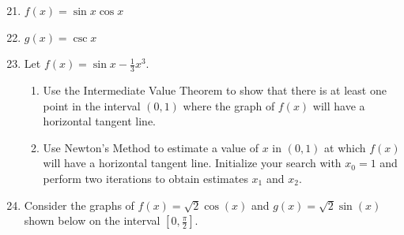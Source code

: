 \documentclass[12pt]{article}
\newif\ifans
\begin{document}
\begin{enumerate}
\setcounter{enumi}{20}

\item $f(x) = \sin{x}\cos{x}$ 

\ifans{\fbox{$\frac{\pi}{4}, \frac{3\pi}{4}, \frac{5\pi}{4}, \frac{7\pi}{4}$}} \fi

\item $g(x) = \csc{x}$ 

\ifans{\fbox{$\frac{\pi}{2}, \frac{3\pi}{2}$}} \fi

\item Let $f(x)=\sin{x}-\frac{1}{3}x^3$.

\begin{enumerate}

\item Use the Intermediate Value Theorem to show that there is at least one point in the interval $(0,1)$ where the graph of $f(x)$ will have a horizontal tangent line.

\ifans{\fbox{\parbox{1\linewidth}{$f^{\prime}(x)=\cos{x}-x^2$.  Firstly, notice that $f^{\prime}(x)$ is continuous for all $x$; therefore, it is continuous for all $x$ in $[0,1]$.  Secondly, notice that $f^{\prime}(0)=1>0$ and $f^{\prime}(1)=\cos{(1)}-1<0$.  Thus, the Intermediate Value Theorem states there is at least one $x_0$ in the interval $(0,1)$ with $f^{\prime}(x_0)=0$.  In other words, there is at least one $x_0$ in $(0,1)$ where $f(x)$ will have a horizontal tangent line.}}} \fi

\item Use Newton's Method to estimate a value of $x$ in $(0,1)$ at which $f(x)$ will have a horizontal tangent line.  Initialize your search with $x_0=1$ and perform two iterations to obtain estimates $x_1$ and $x_2$.

\ifans{\fbox{$x_1 = 0.8382184099$, $x_2= 0.8242418682$.}} \fi

\end{enumerate}

\item Consider the graphs of $f(x)=\sqrt{2}\cos(x)$ and $g(x)=\sqrt{2}\sin(x)$ shown below on the interval $\left[0,\frac{\pi}{2}\right]$.


\end{enumerate}
\end{document}
